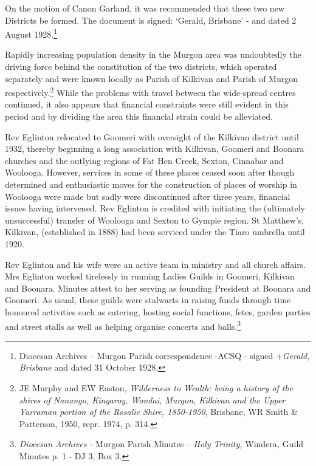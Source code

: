 On the motion of Canon Garland, it was recommended that these two new Districts be formed. The document is signed: `Gerald, Brisbane' - and dated 2 August 1928.\footnote{Diocesan Archives -- Murgon Parish correspondence -ACSQ - signed +\emph{Gerald, Brisbane} and dated 31 October 1928.}


Rapidly increasing population density in the Murgon area was undoubtedly the driving force behind the constitution of the two districts, which operated separately and were known locally as Parish of Kilkivan and Parish of Murgon respectively.\footnote{JE Murphy and EW Easton, \emph{Wilderness to Wealth: being a history of the shires of Nanango, Kingaroy, Wondai, Murgon, Kilkivan and the Upper Yarraman portion of the Rosalie Shire, 1850-1950}, Brisbane, WR Smith \& Patterson, 1950, repr. 1974, p. 314.} While the problems with travel between the wide-spread centres continued, it also appears that financial constraints were still evident in this period and by dividing the area this financial strain could be alleviated.


Rev Eglinton relocated to Goomeri with oversight of the Kilkivan district until 1932, thereby beginning a long association with Kilkivan, Goomeri and Boonara churches and the outlying regions of Fat Hen Creek, Sexton, Cinnabar and Woolooga. However, services in some of these places ceased soon after though determined and enthusiastic moves for the construction of places of worship in Woolooga were made but sadly were discontinued after three years, financial issues having intervened. Rev Eglinton is credited with initiating the (ultimately unsuccessful) transfer of Woolooga and Sexton to Gympie region. St Matthew's, Kilkivan, (established in 1888) had been serviced under the Tiaro umbrella until 1920.



Rev Eglinton and his wife were an active team in ministry and all church affairs. Mrs Eglinton worked tirelessly in running Ladies Guilds in Goomeri, Kilkivan and Boonara. Minutes attest to her serving as founding President at Boonara and Goomeri. As usual, these guilds were stalwarts in raising funds through time honoured activities such as catering, hosting social functions, fetes, garden parties and street stalls as well as helping organise concerts and balls.\footnote{\emph{Diocesan Archives -} Murgon Parish Minutes -- \emph{Holy Trinity,} Windera\emph{,} Guild Minutes p. 1 - DJ 3, Box 3.}


\balance


